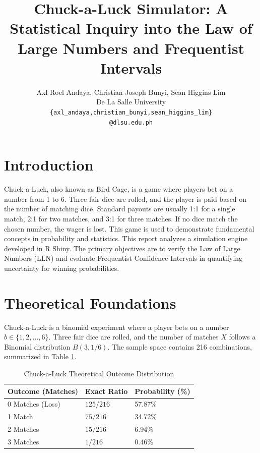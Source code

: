 \documentclass{article}
\title{Chuck-a-Luck Simulator: A Statistical Inquiry into the Law of Large Numbers and Frequentist Intervals}
\author{
    Axl Roel Andaya, Christian Joseph Bunyi, Sean Higgins Lim \\
    De La Salle University \\
    \texttt{\{axl\_andaya,christian\_bunyi,sean\_higgins\_lim\}} \\ \texttt{@dlsu.edu.ph}
}
\date{}
\begin{document}
\maketitle



\section{Introduction}
Chuck-a-Luck, also known as Bird Cage, is a game where players bet on a number from 1 to 6. Three fair dice are rolled, and the player is paid based on the number of matching dice. Standard payouts are usually 1:1 for a single match, 2:1 for two matches, and 3:1 for three matches. If no dice match the chosen number, the wager is lost. This game is used to demonstrate fundamental concepts in probability and statistics. This report analyzes a simulation engine developed in R Shiny. The primary objectives are to verify the Law of Large Numbers (LLN) and evaluate Frequentist Confidence Intervals in quantifying uncertainty for winning probabilities.

\section{Theoretical Foundations}
Chuck-a-Luck is a binomial experiment where a player bets on a number $b \in \{1, 2, ..., 6\}$. Three fair dice are rolled, and the number of matches $X$ follows a Binomial distribution $B(3, 1/6)$. The sample space contains 216 combinations, summarized in Table \ref{tab:outcomes}.

\begin{table}[!htbp]
    \centering
    \caption{Chuck-a-Luck Theoretical Outcome Distribution}
    \begin{tabular}{lll}
        \toprule
        Outcome (Matches) & Exact Ratio & Probability (\%) \\
        \midrule
        0 Matches (Loss)  & $125/216$   & 57.87\% \\
        1 Match           & $75/216$    & 34.72\% \\
        2 Matches         & $15/216$    & 6.94\%  \\
        3 Matches         & $1/216$     & 0.46\%  \\
        \bottomrule
    \end{tabular}
    \label{tab:outcomes}
\end{table}
\end{document}
